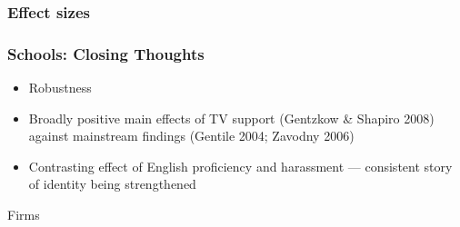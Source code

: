 \documentclass{beamer}
\begin{document}
\begin{frame}
\frametitle{Effect sizes}

\begin{center}
\end{center}


\end{frame}

\begin{frame}
\frametitle{Schools: Closing Thoughts}
\label{schl_close}
\begin{itemize}
\item  Robustness \hyperlink{schl_robust}{}  \hyperlink{schl_spatial}{}
\item Broadly positive main effects of TV support {\footnotesize(Gentzkow \& Shapiro 2008)} against mainstream findings {\footnotesize (Gentile 2004; Zavodny 2006)}
\item Contrasting effect of English proficiency and harassment --- consistent story of identity being strengthened
\end{itemize}
\end{frame}



\begin{frame}

\huge {\color{darkblue} Firms}

\end{frame}
\end{document}
